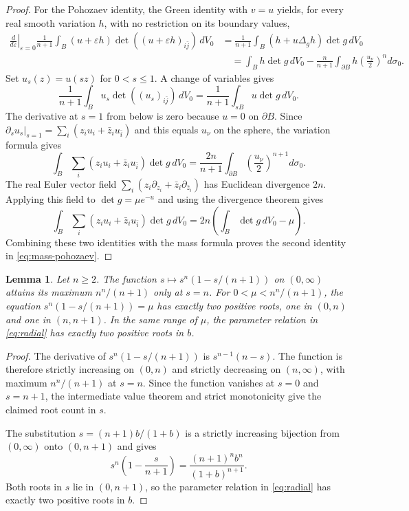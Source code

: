 \documentclass[11pt]{article}
\newtheorem{lemma}[theorem]{Lemma}
\begin{document}
\begin{proof}
For the Pohozaev identity, the Green identity with $v=u$ yields,
for every real smooth variation $h$, with no restriction on its
boundary values,
\begin{align*}
 \left.\frac d{d\varepsilon}\right|_{\varepsilon=0}
 \frac1{n+1}\int_B(u+\varepsilon h)
       \det((u+\varepsilon h)_{i\bar j})\,dV_0&=\frac1{n+1}\int_B(h+u\Delta_gh)\det g\,dV_0\\
 &\quad=\int_Bh\det g\,dV_0-
 \frac n{n+1}\int_{\partial B}h\left(\frac{u_\nu}{2}\right)^n d\sigma_0.
\end{align*}
Set $u_s(z)=u(sz)$ for $0<s\le1$. A change of variables gives
$$
 \frac1{n+1}\int_Bu_s\det((u_s)_{i\bar j})\,dV_0
 =\frac1{n+1}\int_{sB}u\det g\,dV_0.
$$
The derivative at $s=1$ from below is zero because $u=0$ on
$\partial B$. Since $\left.\partial_su_s\right|_{s=1}
=\sum_i(z_iu_i+\bar z_iu_{\bar i})$ and this equals $u_\nu$ on
the sphere, the variation formula gives
$$
 \int_B\sum_i(z_iu_i+\bar z_iu_{\bar i})\det g\,dV_0
 =\frac{2n}{n+1}\int_{\partial B}
       \left(\frac{u_\nu}{2}\right)^{n+1}d\sigma_0.
$$
The real Euler vector field
$\sum_i(z_i\partial_{z_i}+\bar z_i\partial_{\bar z_i})$ has Euclidean
divergence $2n$. Applying this field to $\det g=\mu e^{-u}$ and using
the divergence theorem gives
$$
 \int_B\sum_i(z_iu_i+\bar z_iu_{\bar i})\det g\,dV_0
 =2n\left(\int_B\det g\,dV_0-\mu\right).
$$
Combining these two identities with the mass formula proves
the second identity in \eqref{eq:mass-pohozaev}.
\end{proof}

\begin{lemma}\label{lem:positive-roots}
Let $n\ge2$. The function $s\mapsto s^n(1-s/(n+1))$ on $(0,\infty)$
attains its maximum $n^n/(n+1)$ only at $s=n$. For
$0<\mu<n^n/(n+1)$, the equation $s^n(1-s/(n+1))=\mu$ has exactly two
positive roots, one in $(0,n)$ and one in $(n,n+1)$. In the same range
of $\mu$, the parameter relation in \eqref{eq:radial} has exactly two
positive roots in $b$.
\end{lemma}

\begin{proof}
The derivative of $s^n(1-s/(n+1))$
is $s^{n-1}(n-s)$. The function is therefore strictly increasing on
$(0,n)$ and strictly decreasing on $(n,\infty)$, with maximum
$n^n/(n+1)$ at $s=n$. Since the function vanishes at $s=0$ and $s=n+1$,
the intermediate value theorem and strict monotonicity give the claimed
root count in $s$.

The substitution $s=(n+1)b/(1+b)$ is a strictly increasing bijection
from $(0,\infty)$ onto $(0,n+1)$ and gives
$$
 s^n\left(1-\frac{s}{n+1}\right)
 =\frac{(n+1)^n b^n}{(1+b)^{n+1}}.
$$
Both roots in $s$ lie in $(0,n+1)$, so the parameter relation in
\eqref{eq:radial} has exactly two positive roots in $b$.
\end{proof}
\end{document}
